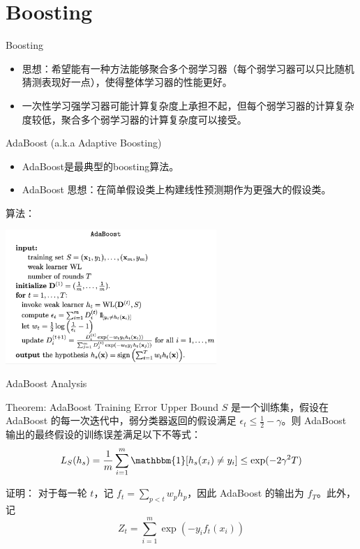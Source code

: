 \section{Boosting}

\begin{frame}{Boosting}

\begin{itemize}
    \item 思想：希望能有一种方法能够聚合多个弱学习器（每个弱学习器可以只比随机猜测表现好一点），使得整体学习器的性能更好。
    \item 一次性学习强学习器可能计算复杂度上承担不起，但每个弱学习器的计算复杂度较低，聚合多个弱学习器的计算复杂度可以接受。
\end{itemize}
\end{frame}

\begin{frame}{AdaBoost (a.k.a Adaptive Boosting)}
\begin{itemize}
    \item AdaBoost是最典型的boosting算法。
    \item AdaBoost 思想：在简单假设类上构建线性预测期作为更强大的假设类。
\end{itemize}
算法：
\begin{center}
    \includegraphics[width=0.6\textwidth]{assets/adaboost.png}
\end{center}
\end{frame}

\begin{frame}{AdaBoost Analysis}
    \begin{block}{Theorem: AdaBoost Training Error Upper Bound}
        $S$ 是一个训练集，假设在 AdaBoost 的每一次迭代中，弱分类器返回的假设满足 $\epsilon_t \leq \frac{1}{2} - \gamma$。则 AdaBoost 输出的最终假设的训练误差满足以下不等式：
        \[
        L_S(h_s) = \frac{1}{m} \sum_{i=1}^{m} \mathbbm{1}[h_s(x_i) \neq y_i] \leq \exp(-2 \gamma^2 T)
        \]
    \end{block}
    证明：
    对于每一轮 $t$，记 $f_t = \sum_{p<t} w_p h_p$，因此 AdaBoost 的输出为 $f_T$。此外，记
\[
Z_t = \sum_{i=1}^{m} \exp(-y_i f_t(x_i))
\]

\end{frame}

